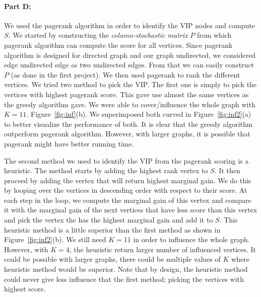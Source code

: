\paragraph{Part D:}
We used the pagerank algorithm in order to identify the VIP nodes and compute $S$. We started by constructing the \emph{column-stochastic matrix} $P$ from which pagerank algorithm can compute the score for all vertices. Since pagerank algorithm is designed for directed graph and our graph undirected, we considered edge undirected edge as two undirected edges. From that we can easily construct $P$ (as done in the first project). We then used pagerank to rank the different vertices. We tried two method to pick the VIP. The first one is simply to pick the vertices with highest pagerank score. This gave use almost the same vertices as the greedy algorithm gave. We were able to cover/influence the whole graph with $K=11$. Figure~\ref{fig:inf}(b). We superimposed both curved in Figure~\ref{fig:inf2}(a) to better visualize the performance of both. It is clear that the greedy algorithm outperform pagerank algorithm. However, with larger graphs, it is possible that pagerank might have better running time. 


The second method we used to identify the VIP from the pagerank scoring is a heuristic. The method starts by adding the highest rank vertex to $S$. It then proceed by adding the vertex that will return highest marginal gain. We do this by looping over the vertices in descending order with respect to their score. At each step in the loop, we compute the marginal gain of this vertex and compare it with the marginal gain of the next vertices that have less score than this vertex and pick the vertex the has the highest marginal gain and add it to $S$. This heuristic method is a little superior than the first method as shown in Figure~\ref{fig:inf2}(b). We still need $K=11$ in order to influence the whole graph. However, with $K=4$, the heuristic return larger number of influenced vertices. It could be possible with larger graphs, there could be multiple values of $K$ where heuristic method would be superior. Note that by design, the heuristic method could never give less influence that the first method; picking the vertices with highest score. 


